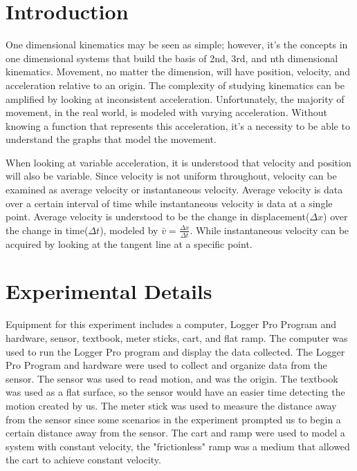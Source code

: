 \documentclass[aps,letterpaper,11pt]{revtex4}
\begin{document}
\section{Introduction}
One dimensional kinematics may be seen as simple; however, it's the concepts in one dimensional systems that build the basis of 2nd, 3rd, and nth dimensional kinematics. Movement, no matter the dimension, will have position, velocity, and acceleration relative to an origin. The complexity of studying kinematics can be amplified by looking at inconsistent acceleration. Unfortunately, the majority of movement, in the real world, is modeled with varying acceleration. Without knowing a function that represents this acceleration, it's a necessity to be able to understand the graphs that model the movement. 

When looking at variable acceleration, it is understood that velocity and position will also be variable. Since velocity is not uniform throughout, velocity can be examined as average velocity or instantaneous velocity. Average velocity is data over a certain interval of time while instantaneous velocity is data at a single point. Average velocity is understood to be the change in displacement($\Delta x$) over the change in time($\Delta t $), modeled by $\bar{v} = \frac{\Delta x}{\Delta t}$. While instantaneous velocity can be acquired by looking at the tangent line at a specific point.

\newpage

\section{Experimental Details}

Equipment for this experiment includes a computer, Logger Pro Program and hardware, sensor, textbook, meter sticks, cart, and flat ramp. The computer was used to run the Logger Pro program and display the data collected. The Logger Pro Program and hardware were used to collect and organize data from the sensor. The sensor was used to read motion, and was the origin. The textbook was used as a flat surface, so the sensor would have an easier time detecting the motion created by us. The meter stick was used to measure the distance away from the sensor since some scenarios in the experiment prompted us to begin a certain distance away from the sensor. The cart and ramp were used to model a system with constant velocity, the "frictionless" ramp was a medium that allowed the cart to achieve constant velocity.
\end{document}
